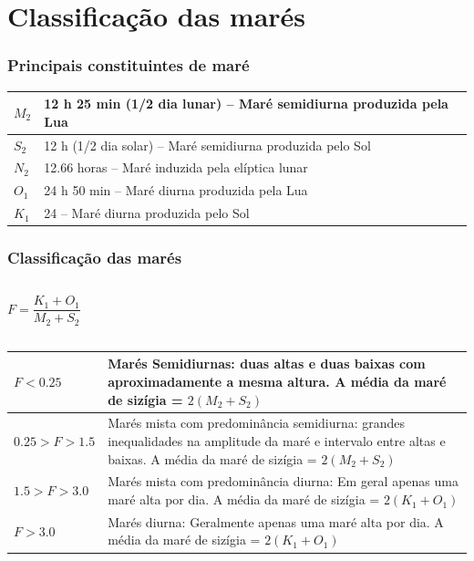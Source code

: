 \section{Classificação das marés}
\begin{frame}
  \frametitle{Principais constituintes de maré}
  \footnotesize{
\begin{table}
    \begin{tabular}{|l|l|}
        \hline
        $M_2$ & 12 h 25 min (1/2 dia lunar) -- Maré semidiurna produzida pela Lua \\ \hline
        $S_2$ & 12 h (1/2 dia solar) -- Maré semidiurna produzida pelo Sol        \\
        $N_2$ & 12.66 horas -- Maré induzida pela elíptica lunar                  \\
        $O_1$ & 24 h 50 min -- Maré diurna produzida pela Lua                     \\
        $K_1$ & 24 -- Maré diurna produzida pelo Sol                              \\
        \hline
    \end{tabular}
\end{table}
}
\end{frame}

\begin{frame}
  \frametitle{Classificação das marés}
    \begin{columns}
    \column{4cm}
    \begin{block}{}
      \[ F = \frac{K_1 + O_1}{M_2 + S_2} \]
    \end{block}
    \end{columns}
\scriptsize{
\begin{table}
    \begin{tabular}{|l|p{9cm}|}
        \hline
        $F < 0.25$       & \parbox{9cm}{Marés Semidiurnas: duas altas e duas baixas com aproximadamente a mesma altura.  A média da maré de sizígia = $2(M_2 + S_2)$} \\ \hline
        $0.25 > F > 1.5$ & \parbox{9cm}{Marés mista com predominância semidiurna: grandes inequalidades na amplitude da maré e intervalo entre altas e baixas.  A média da maré de sizígia = $2(M_2 + S_2)$} \\ \hline
        $1.5 > F > 3.0$  & \parbox{9cm}{Marés mista com predominância diurna: Em geral apenas uma maré alta por dia.  A média da maré de sizígia = $2(K_1 + O_1)$}                                           \\ \hline
        $F > 3.0$        & \parbox{9cm}{Marés diurna: Geralmente apenas uma maré alta por dia. A média da maré de sizígia = $2(K_1 + O_1)$}                                                                 \\ \hline
    \end{tabular}
\end{table}
}
\end{frame}


